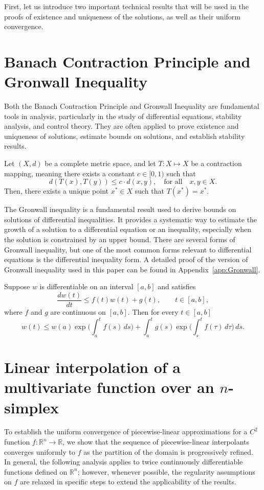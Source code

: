 \documentclass[preprint,12pt]{elsarticle}
\begin{document}
First, let us introduce two important technical results that will be used in the proofs of existence and uniqueness of the solutions, as well as their uniform convergence.
\section[]{Banach Contraction Principle and Gronwall Inequality}
Both the Banach Contraction Principle \cite{Banach1922} and Gronwall Inequality \cite{Gronwall1919} are fundamental tools in analysis, particularly in the study of differential equations, stability analysis, and control theory. They are often applied to prove existence and uniqueness of solutions, estimate bounds on solutions, and establish stability results.
\begin{thm} 
Let \((X, d)\) be a complete metric space, and let \(T: X \mapsto X\) be a contraction mapping, meaning there exists a constant 
\(c \in [0, 1)\) such that
\[
d(T(x), T(y)) \leq c \cdot d(x, y), \quad \text{for all} \quad x, y \in X.
\]
Then, there exists a unique point \(x^* \in X\) such that \(T(x^*) = x^*\).
\end{thm}
The Gronwall inequality is a fundamental result used to derive bounds on solutions of differential inequalities. It provides a systematic way to estimate the growth of a solution to a differential equation or an inequality, especially when the solution is constrained by an upper bound. There are several forms of Gronwall inequality, but one of the most common forms relevant to differential equations is the differential inequality form. A detailed proof of the version of Gronwall inequality used in this paper can be found in Appendix~\ref{app:Gronwall}.
\begin{thm}\label{Gronwall}
Suppose \(w\) is differentiable on an interval \([a,b]\) and satisfies
\[
\frac{dw(t)}{dt} \le f(t) w(t) + g(t), \qquad t\in[a,b],
\]
where \(f\) and \(g\) are continuous on \([a,b]\). Then for every \(t\in[a,b]\)
\[
w(t) \le w(a)\exp\!\Big(\int_a^t f(s)\,ds\Big)
+ \int_a^t g(s)\exp\!\Big(\int_s^t f(\tau)\,d\tau\Big)\,ds .
\]
\end{thm}
\section[]{Linear interpolation of a multivariate function over an $n$-simplex}
To establish the uniform convergence of piecewise-linear approximations for a \( C^2 \) function \( f : \mathbb{R}^n \to \mathbb{R} \), we show that the sequence 
of piecewise-linear interpolants converges uniformly to \( f \) as the partition of the domain is progressively refined. In general, the following analysis applies to twice continuously differentiable functions defined on \( \mathbb{R}^n \); however, whenever possible, the regularity assumptions on \( f \) are relaxed in specific steps to extend the applicability of the results.
\end{document}
